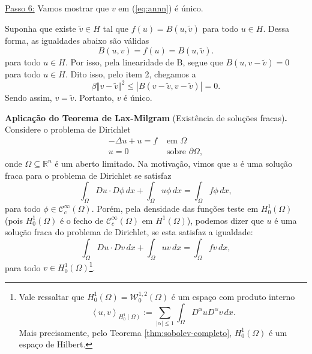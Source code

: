 \documentclass[a4paper, 11pt]{book}
\theoremstyle{definition}
\newcommand{\bR}{\mathbb{R}}
\newcommand{\cC}{\mathcal{C}}
\newcommand{\cW}{\mathcal{W}}
\begin{document}
\begin{prf}
    \underline{Passo 6:} Vamos mostrar que $v$ em (\ref{eq:annn}) é único.

    Suponha que existe $\tilde v \in H$ tal que $f(u) = B(u, \tilde v)$ para todo $u \in H$.
    Dessa forma, as igualdades abaixo são válidas
    \[
        B(u,v) = f(u) = B(u,\tilde v).
    \]
    para todo $u \in H$.
    Por isso, pela linearidade de B, segue que $B(u, v - \tilde v) = 0$ para todo $u \in H$.
    Dito isso, pelo item 2, chegamos a
    \[
        \beta \Vert v - \tilde v \Vert^2 \leqslant | B(v - \tilde v, v - \tilde v) | = 0.
    \]
    Sendo assim, $v = \tilde v$.
    Portanto, $v$ é único.
\end{prf}

\noindent\textbf{Aplicação do Teorema de Lax-Milgram} (Existência de soluções fracas)\textbf{.} Considere o problema de Dirichlet
\begin{equation} \label{eq:problema-de-dirichlet}
    \begin{aligned}
        -\Delta u + u = f &\text{ em } \Omega\\
        u = 0 &\text{ sobre } \partial\Omega,
    \end{aligned}
\end{equation}
onde $\Omega \subseteq \bR^n$ é um aberto limitado.
Na motivação, vimos que $u$ é uma solução fraca para o problema de Dirichlet se satisfaz
\[
    \int_\Omega Du \cdot D\phi \,dx + \int_\Omega u\phi \,dx = \int_\Omega f\phi \,dx,
\]
para todo $\phi \in \cC^{\infty}_c(\Omega)$.
Porém, pela densidade das funções teste em $H^{1}_0(\Omega)$ (pois $H_0^1(\Omega)$ é o fecho de $\cC^{\infty}_c(\Omega)$ em $H^1(\Omega)$), podemos dizer que $u$ é uma solução fraca do problema de Dirichlet, se esta satisfaz a igualdade:
\[
    \int_\Omega Du \cdot Dv \,dx + \int_\Omega uv \,dx = \int_\Omega fv \,dx,
\]
para todo $v \in H_0^1(\Omega)$\footnote{Vale ressaltar que $H_0^1(\Omega) = \cW^{1,2}_0(\Omega)$ é um espaço com produto interno
\[
    \left\langle u, v \right\rangle _{H^1_0(\Omega)} := \sum_{|\alpha| \leqslant 1}\int_\Omega D^\alpha u D^\alpha v \,dx.
\]
Mais precisamente, pelo Teorema \ref{thm:sobolev-completo}, $H^1_0(\Omega)$ é um espaço de Hilbert.
}.
\end{document}
